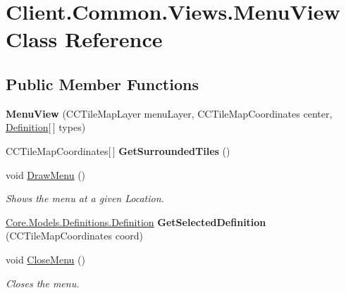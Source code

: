 \hypertarget{classClient_1_1Common_1_1Views_1_1MenuView}{\section{Client.\-Common.\-Views.\-Menu\-View Class Reference}
\label{classClient_1_1Common_1_1Views_1_1MenuView}
}
\subsection*{Public Member Functions}
\begin{DoxyCompactItemize}
\item 
\hypertarget{classClient_1_1Common_1_1Views_1_1MenuView_a625e8f113e66ae12b1ebb9142ef9072d}{{\bfseries Menu\-View} (C\-C\-Tile\-Map\-Layer menu\-Layer, C\-C\-Tile\-Map\-Coordinates center, \hyperlink{classCore_1_1Models_1_1Definitions_1_1Definition}{Definition}\mbox{[}$\,$\mbox{]} types)}\label{classClient_1_1Common_1_1Views_1_1MenuView_a625e8f113e66ae12b1ebb9142ef9072d}

\item 
\hypertarget{classClient_1_1Common_1_1Views_1_1MenuView_aab5290ebf833abcf80e67c46199cb53d}{C\-C\-Tile\-Map\-Coordinates\mbox{[}$\,$\mbox{]} {\bfseries Get\-Surrounded\-Tiles} ()}\label{classClient_1_1Common_1_1Views_1_1MenuView_aab5290ebf833abcf80e67c46199cb53d}

\item 
void \hyperlink{classClient_1_1Common_1_1Views_1_1MenuView_a52c67c8cd89babbf271a40f01e627b7a}{Draw\-Menu} ()
\begin{DoxyCompactList}\small\item\em Shows the menu at a given Location. \end{DoxyCompactList}\item 
\hypertarget{classClient_1_1Common_1_1Views_1_1MenuView_ae8d1c45d630862f67843b76195c2c5dd}{\hyperlink{classCore_1_1Models_1_1Definitions_1_1Definition}{Core.\-Models.\-Definitions.\-Definition} {\bfseries Get\-Selected\-Definition} (C\-C\-Tile\-Map\-Coordinates coord)}\label{classClient_1_1Common_1_1Views_1_1MenuView_ae8d1c45d630862f67843b76195c2c5dd}

\item 
void \hyperlink{classClient_1_1Common_1_1Views_1_1MenuView_abd8d48d776f40caf15251786866331bc}{Close\-Menu} ()
\begin{DoxyCompactList}\small\item\em Closes the menu. \end{DoxyCompactList}\end{DoxyCompactItemize}


